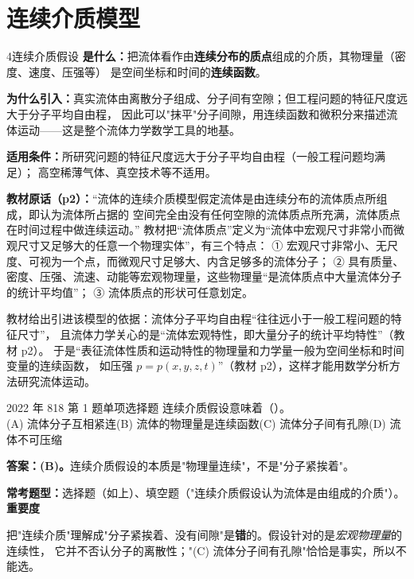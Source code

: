 \section{连续介质模型}

\begin{kaodian}{4}{连续介质假设}
\textbf{是什么：}把流体看作由\textbf{连续分布的质点}组成的介质，其物理量（密度、速度、压强等）
是空间坐标和时间的\textbf{连续函数}。

\textbf{为什么引入：}真实流体由离散分子组成、分子间有空隙；但工程问题的特征尺度远大于分子平均自由程，
因此可以"抹平"分子间隙，用连续函数和微积分来描述流体运动——这是整个流体力学数学工具的地基。

\textbf{适用条件：}所研究问题的特征尺度远大于分子平均自由程（一般工程问题均满足）；
高空稀薄气体、真空技术等不适用。

\textbf{教材原话（p2）：}“流体的连续介质模型假定流体是由连续分布的流体质点所组成，即认为流体所占据的
空间完全由没有任何空隙的流体质点所充满，流体质点在时间过程中做连续运动。”
教材把“流体质点”定义为“流体中宏观尺寸非常小而微观尺寸又足够大的任意一个物理实体”，有三个特点：
① 宏观尺寸非常小、无尺度、可视为一个点，而微观尺寸足够大、内含足够多的流体分子；
② 具有质量、密度、压强、流速、动能等宏观物理量，这些物理量“是流体质点中大量流体分子的统计平均值”；
③ 流体质点的形状可任意划定。

教材给出引进该模型的依据：流体分子平均自由程“往往远小于一般工程问题的特征尺寸”，
且流体力学关心的是“流体宏观特性，即大量分子的统计平均特性”（教材 p2）。
于是“表征流体性质和运动特性的物理量和力学量一般为空间坐标和时间变量的连续函数，
如压强 $p=p(x,y,z,t)$”（教材 p2），这样才能用数学分析方法研究流体运动。

\begin{zhenti}{2022 年 818 第 1 题}{单项选择题}
连续介质假设意味着（\quad）。\\
(A) 流体分子互相紧连\quad (B) 流体的物理量是连续函数\quad (C) 流体分子间有孔隙\quad (D) 流体不可压缩
\end{zhenti}
\noindent\textbf{答案：(B)。}连续介质假设的本质是"物理量连续"，不是"分子紧挨着"。

\textbf{常考题型：}选择题（如上）、填空题（"连续介质假设认为流体是由\underline{\hspace{1.5cm}}组成的介质"）。
\textbf{重要度 }\quad{}\quad{}

\begin{yicuo}
把"连续介质"理解成"分子紧挨着、没有间隙"是\textbf{错}的。假设针对的是\emph{宏观物理量}的连续性，
它并不否认分子的离散性；"(C) 流体分子间有孔隙"恰恰是事实，所以不能选。
\end{yicuo}
\end{kaodian}


